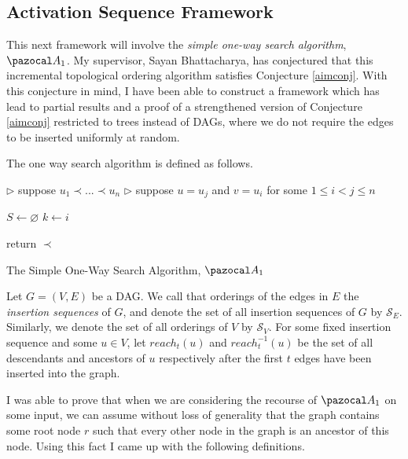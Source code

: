 \documentclass{article}
\begin{document}
\subsection{Activation Sequence Framework}

This next framework will involve the \textit{simple one-way search algorithm}, $\pazocal A_1$. My supervisor, Sayan Bhattacharya, has conjectured that this incremental topological ordering algorithm satisfies Conjecture \ref{aimconj}. With this conjecture in mind, I have been able to construct a framework which has lead to partial results and a proof of a strengthened version of Conjecture \ref{aimconj} restricted to trees instead of DAGs, where we do not require the edges to be inserted uniformly at random.

The one way search algorithm is defined as follows.

\begin{algorithm}[H]\label{oneway}
    \SetAlgoLined
    
    
    $\triangleright$ suppose $u_1 \prec ... \prec u_n$\;
    $\triangleright$ suppose $u = u_j$ and $v=u_i$ for some $1 \leq i < j \leq n$\;
    
    $S \leftarrow \varnothing$\;
    $k \leftarrow i$\;
    
    
    return $\prec$\;
    \caption{The Simple One-Way Search Algorithm, $\pazocal A_1$}
\end{algorithm}

Let $G=(V,E)$ be a DAG. We call that orderings of the edges in $E$ the \textit{insertion sequences} of $G$, and denote the set of all insertion sequences of $G$ by $\mathcal S_E$. Similarly, we denote the set of all orderings of $V$ by $\mathcal S_V$. For some fixed insertion sequence and some $u \in V$, let $reach_t(u)$ and $reach_t^{-1}(u)$ be the set of all descendants and ancestors of $u$ respectively after the first $t$ edges have been inserted into the graph. 

I was able to prove that when we are considering the recourse of $\pazocal A_1$ on some input, we can assume without loss of generality that the graph contains some root node $r$ such that every other node in the graph is an ancestor of this node. Using this fact I came up with the following definitions.
\end{document}
